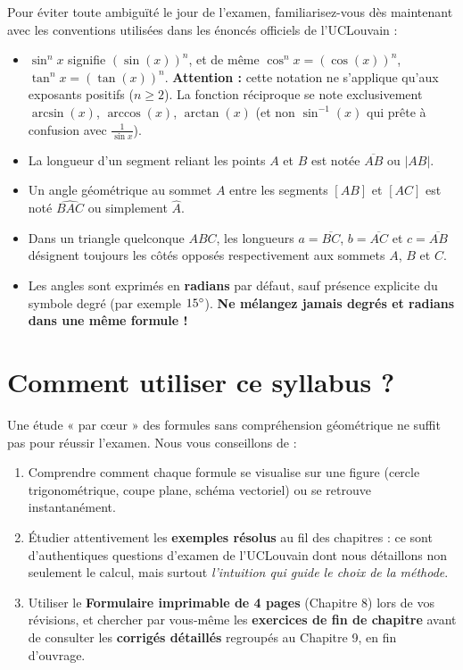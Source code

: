 \documentclass[11pt,a4paper,oneside]{book}
\begin{document}
Pour éviter toute ambiguïté le jour de l'examen, familiarisez-vous dès maintenant avec les conventions utilisées dans les énoncés officiels de l'UCLouvain :
\begin{itemize}
    \item $\sin^n x$ signifie $(\sin(x))^n$, et de même $\cos^n x = (\cos(x))^n$, $\tan^n x = (\tan(x))^n$. \textbf{Attention :} cette notation ne s'applique qu'aux exposants positifs ($n \ge 2$). La fonction réciproque se note exclusivement $\arcsin(x)$, $\arccos(x)$, $\arctan(x)$ (et non $\sin^{-1}(x)$ qui prête à confusion avec $\frac{1}{\sin x}$).
    \item La longueur d'un segment reliant les points $A$ et $B$ est notée $\overline{AB}$ ou $|AB|$.
    \item Un angle géométrique au sommet $A$ entre les segments $[AB]$ et $[AC]$ est noté $\widehat{BAC}$ ou simplement $\widehat{A}$.
    \item Dans un triangle quelconque $ABC$, les longueurs $a = \overline{BC}$, $b = \overline{AC}$ et $c = \overline{AB}$ désignent toujours les côtés opposés respectivement aux sommets $A$, $B$ et $C$.
    \item Les angles sont exprimés en \textbf{radians} par défaut, sauf présence explicite du symbole degré (par exemple $15\degree$). \textbf{Ne mélangez jamais degrés et radians dans une même formule !}
\end{itemize}

\section*{Comment utiliser ce syllabus ?}

Une étude « par cœur » des formules sans compréhension géométrique ne suffit pas pour réussir l'examen. Nous vous conseillons de :
\begin{enumerate}
    \item Comprendre comment chaque formule se visualise sur une figure (cercle trigonométrique, coupe plane, schéma vectoriel) ou se retrouve instantanément.
    \item Étudier attentivement les \textbf{exemples résolus} au fil des chapitres : ce sont d'authentiques questions d'examen de l'UCLouvain dont nous détaillons non seulement le calcul, mais surtout \emph{l'intuition qui guide le choix de la méthode}.
    \item Utiliser le \textbf{Formulaire imprimable de 4 pages} (Chapitre 8) lors de vos révisions, et chercher par vous-même les \textbf{exercices de fin de chapitre} avant de consulter les \textbf{corrigés détaillés} regroupés au Chapitre 9, en fin d'ouvrage.
\end{enumerate}

\tableofcontents











\end{document}

